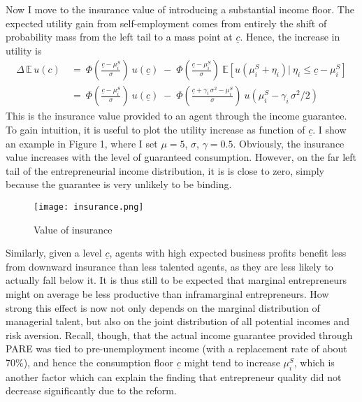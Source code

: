 \noindent Now I move to the insurance value of introducing a substantial income floor. The expected utility gain from self-employment comes from entirely the shift of probability mass from the left tail to a mass point at $\underline{c}$. Hence, the increase in utility is
\begin{align}
\Delta \,	\mathbb{E}\, u(c) \: & = \: \Phi\left(\frac{\underline{c} - \mu^S_i}{\sigma}\right) \: u(\underline{c}) \; - \; \Phi\left(\frac{\underline{c} - \mu_i^S}{\sigma}\right) \: \mathbb{E}\left[ u\left(\mu_i^S + \eta_i \right) | \:\eta_i \leq \underline{c} - \mu_i^S  \right]  \\[6pt]
& = \: \Phi\left(\frac{\underline{c} - \mu_i^S}{\sigma}\right) \: u(\underline{c}) \; - \; \Phi\left(\frac{\underline{c} + \gamma_i \, \sigma^2 - \mu_i^S}{\sigma}\right) \: u\left(\mu_i^S -  \gamma_i \,  \sigma^2 /2 \right)
\end{align}
This is the insurance value provided to an agent through the income guarantee. To gain intuition, it is useful to plot the utility increase as function of $\underline{c}$. I show an example in Figure 1, where I set $\mu = 5$, $\sigma$, $\gamma = 0.5$. 
Obviously, the insurance value increases with the level of guaranteed consumption. However, on the far left tail of the entrepreneurial income distribution, it is is close to zero, simply because the guarantee is very unlikely to be binding.
\begin{figure}[htb]  \vspace{-1em}
\centering
\caption{Value of insurance} \vspace{-3pt}
\texttt{[image: insurance.png]} \vspace{-1.5em}
\end{figure}

Similarly, given a level $\underline{c}$, agents with high expected business profits benefit less from downward insurance than less talented agents, as they are less likely to actually fall below it. It is thus still to be expected that marginal entrepreneurs might on average be less productive than inframarginal entrepreneurs. How strong this effect is now not only depends on the marginal distribution of managerial talent, but also on the joint distribution of all potential incomes and risk aversion. Recall, though, that the actual income guarantee provided through PARE was tied to pre-unemployment income (with a replacement rate of about 70$\%$), and hence the consumption floor $\underline{c}$ might tend to increase $\mu_i^S$, which is another factor which can explain the finding that entrepreneur quality did not decrease significantly due to the reform.


